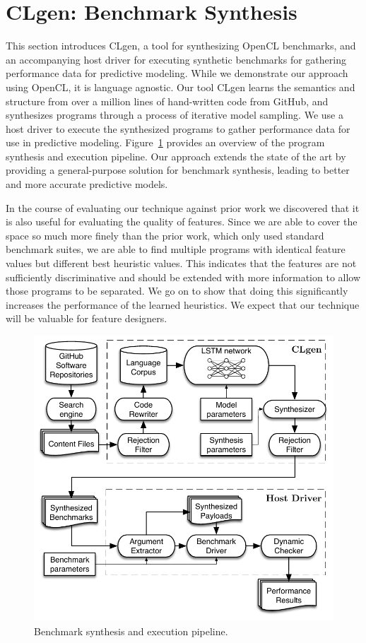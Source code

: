 \section{CLgen: Benchmark Synthesis}%
\label{sec:lang-corpus}


This section introduces CLgen, a tool for synthesizing OpenCL benchmarks, and an accompanying host driver for executing synthetic benchmarks for gathering performance data for predictive modeling. While we demonstrate our approach using OpenCL, it is language agnostic. Our tool CLgen learns the semantics and structure from over a million lines of hand-written code from GitHub, and synthesizes programs through a process of iterative model sampling. We use a host driver to execute the synthesized programs to gather performance data for use in predictive modeling. Figure~\ref{fig:pipeline} provides an overview of the program synthesis and execution pipeline. Our approach extends the state of the art by providing a general-purpose solution for benchmark synthesis, leading to better and more accurate predictive models.

In the course of evaluating our technique against prior work we discovered that it is also useful for evaluating the quality of features. Since we are able to cover the space so much more finely than the prior work, which only used standard benchmark suites, we are able to find multiple programs with identical feature values but different best heuristic values. This indicates that the features are not sufficiently discriminative and should be extended with more information to allow those programs to be separated. We go on to show that doing this significantly increases the performance of the learned heuristics. We expect that our technique will be valuable for feature designers.

\begin{figure}
	\centering%
	\includegraphics[width=.75\columnwidth]{img/pipeline}%
	\caption{Benchmark synthesis and execution pipeline.}%
	\label{fig:pipeline}
\end{figure}

